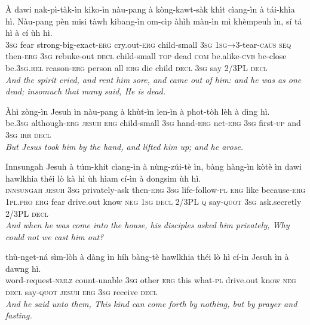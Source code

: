 \documentclass[11pt,a4paper]{article}
\begin{document}
\begin{exe}
\gll À dawi nak-pì-tàk-ìn kiko-ìn nàu-pang à kòng-kawt-sàk khìt cìang-ìn à tái-khìa hì. Nàu-pang pèn misi tàwh kibang-ìn om-cìp àhìh màn-ìn mì khèmpeuh ìn, sí tá hì à cí ùh hì. \\
     \textsc{3sg} fear strong-big-exact-\textsc{erg} cry.out-\textsc{erg} child-small \textsc{3sg} \textsc{1sg→3}-tear-\textsc{caus} \textsc{seq} then-\textsc{erg} \textsc{3sg} rebuke-out \textsc{decl} child-small \textsc{top} dead \textsc{com} be.alike-\textsc{cvb} be-close be.\textsc{3sg}.\textsc{rel} reason-\textsc{erg} person all \textsc{erg} die child \textsc{decl} \textsc{3sg} say 2/3PL \textsc{decl} \\
\glt \textcolor{kjvcolor}{\textit{And the spirit cried, and rent him sore, and came out of him: and he was as one dead; insomuch that many said, He is dead.}}

\gll Àhì zòng-ìn Jesuh ìn nàu-pang à khùt-ìn len-ìn à phot-tòh lèh à dìng hì. \\
     be.\textsc{3sg} although-\textsc{erg} \textsc{jesuh} \textsc{erg} child-small \textsc{3sg} hand-\textsc{erg} net-\textsc{erg} \textsc{3sg} first-\textsc{up} and \textsc{3sg} \textsc{irr} \textsc{decl} \\
\glt \textcolor{kjvcolor}{\textit{But Jesus took him by the hand, and lifted him up; and he arose.}}

\gll Innsungah Jesuh à túm-khit cìang-ìn à nùng-zúi-tè ìn, bàng hàng-ìn kòtè ìn dawi hawlkhia théi lò kà hì ùh hìam cí-ìn à dongsim ùh hì. \\
     \textsc{innsungah} \textsc{jesuh} \textsc{3sg} privately-ask then-\textsc{erg} \textsc{3sg} life-follow-\textsc{pl} \textsc{erg} like because-\textsc{erg} \textsc{1pl}.\textsc{pro} \textsc{erg} fear drive.out know \textsc{neg} \textsc{1sg} \textsc{decl} 2/3PL \textsc{q} say-\textsc{quot} \textsc{3sg} ask.secretly 2/3PL \textsc{decl} \\
\glt \textcolor{kjvcolor}{\textit{And when he was come into the house, his disciples asked him privately, Why could not we cast him out?}}

\gll thù-nget-ná sìm-lòh à dàng ìn híh bàng-tè hawlkhia théi lò hì cí-ìn Jesuh ìn à dawng hì. \\
     word-request-\textsc{nmlz} count-unable \textsc{3sg} other \textsc{erg} this what-\textsc{pl} drive.out know \textsc{neg} \textsc{decl} say-\textsc{quot} \textsc{jesuh} \textsc{erg} \textsc{3sg} receive \textsc{decl} \\
\glt \textcolor{kjvcolor}{\textit{And he said unto them, This kind can come forth by nothing, but by prayer and fasting.}}


\end{exe}
\end{document}
